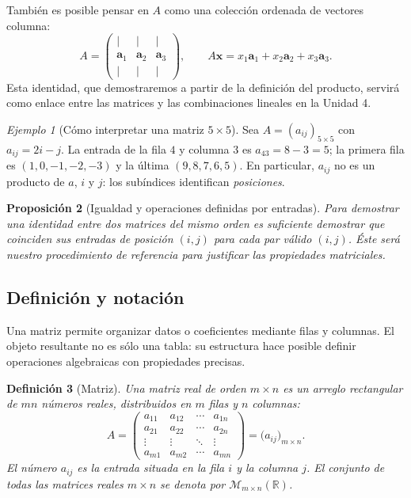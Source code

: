 \documentclass[12pt]{article}
\newtheorem{definicion}{Definición}[section]
\newtheorem{proposicion}[definicion]{Proposición}
\theoremstyle{remark}
\newtheorem{ejemplo}[definicion]{Ejemplo}
\newcommand{\R}{\mathbb{R}}
\newcommand{\Mat}[2]{\mathcal{M}_{#1\times #2}}
\newcommand{\vect}[1]{\boldsymbol{#1}}
\begin{document}
También es posible pensar en $A$ como una colección ordenada de vectores columna:
\[
A=\begin{pmatrix}|&|&|\\\vect a_1&\vect a_2&\vect a_3\\|&|&|\end{pmatrix},\qquad
A\vect x=x_1\vect a_1+x_2\vect a_2+x_3\vect a_3.
\]
Esta identidad, que demostraremos a partir de la definición del producto, servirá como enlace entre las matrices y las combinaciones lineales en la Unidad 4.

\begin{ejemplo}[Cómo interpretar una matriz $5\times5$]
Sea $A=(a_{ij})_{5\times5}$ con $a_{ij}=2i-j$. La entrada de la fila $4$ y columna $3$ es $a_{43}=8-3=5$; la primera fila es $(1,0,-1,-2,-3)$ y la última $(9,8,7,6,5)$. En particular, $a_{ij}$ no es un producto de $a$, $i$ y $j$: los subíndices identifican \emph{posiciones}.
\end{ejemplo}

\begin{proposicion}[Igualdad y operaciones definidas por entradas]
Para demostrar una identidad entre dos matrices del mismo orden es suficiente demostrar que coinciden sus entradas de posición $(i,j)$ para cada par válido $(i,j)$. Éste será nuestro procedimiento de referencia para justificar las propiedades matriciales.
\end{proposicion}



\subsection{Definición y notación}
Una matriz permite organizar datos o coeficientes mediante filas y columnas. El objeto resultante no es sólo una tabla: su estructura hace posible definir operaciones algebraicas con propiedades precisas.

\begin{definicion}[Matriz]
Una \emph{matriz real de orden $m\times n$} es un arreglo rectangular de $mn$ números reales, distribuidos en $m$ filas y $n$ columnas:
\[
A=\begin{pmatrix}
a_{11}&a_{12}&\cdots&a_{1n}\\
a_{21}&a_{22}&\cdots&a_{2n}\\
\vdots&\vdots&\ddots&\vdots\\
a_{m1}&a_{m2}&\cdots&a_{mn}
\end{pmatrix}=\bigl(a_{ij}\bigr)_{m\times n}.
\]
El número $a_{ij}$ es la entrada situada en la fila $i$ y la columna $j$. El conjunto de todas las matrices reales $m\times n$ se denota por $\Mat{m}{n}(\R)$.
\end{definicion}
\end{document}
